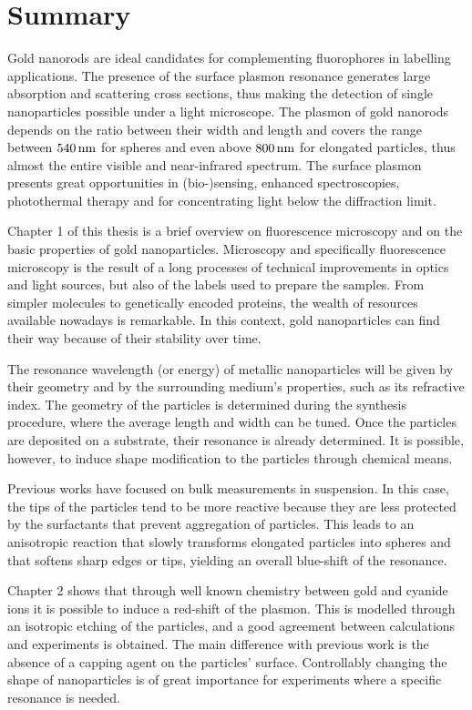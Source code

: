 \chapter*{Summary}

Gold nanorods are ideal candidates for complementing fluorophores in labelling
applications. The presence of the surface plasmon resonance generates large
absorption and scattering cross sections, thus making the detection of single
nanoparticles possible under a light microscope. The plasmon of gold nanorods
depends on the ratio between their width and length and covers the range between
$540\,\textrm{nm}$ for spheres and even above $800\,\textrm{nm}$ for elongated particles, thus
almost the entire visible and near-infrared spectrum. The surface plasmon
presents great opportunities in (bio-)sensing, enhanced spectroscopies,
photothermal therapy and for concentrating light below the diffraction limit.

Chapter 1 of this thesis is a brief overview on fluorescence microscopy and on
the basic properties of gold nanoparticles. Microscopy and specifically
fluorescence microscopy is the result of a long processes of technical
improvements in optics and light sources, but also of the labels used to prepare
the samples. From simpler molecules to genetically encoded proteins, the wealth
of resources available nowadays is remarkable. In this context, gold
nanoparticles can find their way because of their stability over time. 

The resonance wavelength (or energy) of metallic nanoparticles will be given by
their geometry and by the surrounding medium's properties, such as its
refractive index. The geometry of the particles is determined during the
synthesis procedure, where the average length and width can be tuned. Once the
particles are deposited on a substrate, their resonance is already determined.
It is possible, however, to induce shape modification to the particles through
chemical means.

Previous works have focused on bulk measurements in suspension. In this case,
the tips of the particles tend to be more reactive because they are less
protected by the surfactants that prevent aggregation of particles. This leads
to an anisotropic reaction that slowly transforms elongated particles into
spheres and that softens sharp edges or tips, yielding an overall blue-shift of
the resonance.

Chapter 2 shows that through well known chemistry between gold and cyanide ions
it is possible to induce a red-shift of the plasmon. This is modelled through an
isotropic etching of the particles, and a good agreement between calculations
and experiments is obtained. The main difference with previous work is the
absence of a capping agent on the particles' surface. Controllably changing the
shape of nanoparticles is of great importance for experiments where a specific
resonance is needed.

